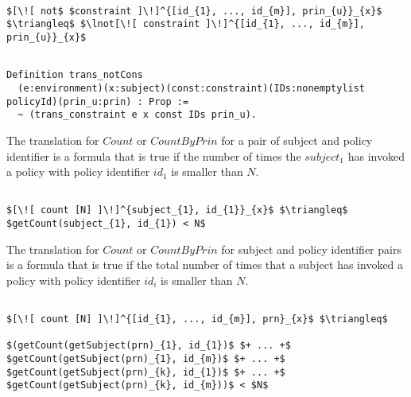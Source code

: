 \lstset{mathescape, language=AST}  
\begin{lstlisting}[frame=single, caption={Not Constraint Translation},label={lst:transnotCons}]

$[\![ not$ $constraint ]\!]^{[id_{1}, ..., id_{m}], prin_{u}}_{x}$ $\triangleq$ $\lnot[\![ constraint ]\!]^{[id_{1}, ..., id_{m}], prin_{u}}_{x}$ 

\end{lstlisting}

\begin{lstlisting}

Definition trans_notCons
  (e:environment)(x:subject)(const:constraint)(IDs:nonemptylist policyId)(prin_u:prin) : Prop :=
  ~ (trans_constraint e x const IDs prin_u).
\end{lstlisting}

The translation for $Count$ or $CountByPrin$ for a pair of subject and policy identifier is a formula that is true if the number of times the $subject_{1}$ has invoked a policy with policy identifier $id_{1}$ is smaller than $N$.

\lstset{mathescape, language=AST}  
\begin{lstlisting}[frame=single, caption={Count Translation {$\colon$} subject and policyId pair},label={lst:transcountSinglePair}]

$[\![ count [N] ]\!]^{subject_{1}, id_{1}}_{x}$ $\triangleq$ $getCount(subject_{1}, id_{1}) < N$
\end{lstlisting}

The translation for $Count$ or $CountByPrin$ for subject and policy identifier pairs is a formula that is true if the total number of times that a subject has invoked a policy with policy identifier $id_{i}$ is smaller than $N$.

\lstset{mathescape, language=AST}  
\begin{lstlisting}[frame=single, caption={Count Translation {$\colon$} subject and policyId pairs},label={lst:transcountPairs}]

$[\![ count [N] ]\!]^{[id_{1}, ..., id_{m}], prn}_{x}$ $\triangleq$ 

$(getCount(getSubject(prn)_{1}, id_{1})$ $+ ... +$ $getCount(getSubject(prn)_{1}, id_{m})$ $+ ... +$ $getCount(getSubject(prn)_{k}, id_{1})$ $+ ... +$ $getCount(getSubject(prn)_{k}, id_{m}))$ < $N$


\end{lstlisting}




